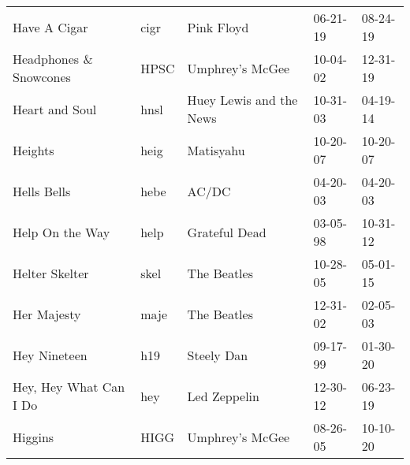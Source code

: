 \begin{longtable}{p{}p{}p{}p{}p{}}
                                                            Have A Cigar &          cigr &                                               Pink Floyd &              06-21-19 &             08-24-19 \\
                                                 Headphones \& Snowcones &          HPSC &                                          Umphrey's McGee &              10-04-02 &             12-31-19 \\
                                                          Heart and Soul &          hnsl &                                  Huey Lewis and the News &              10-31-03 &             04-19-14 \\
                                                                 Heights &          heig &                                                Matisyahu &              10-20-07 &             10-20-07 \\
                                                             Hells Bells &          hebe &                                                    AC/DC &              04-20-03 &             04-20-03 \\
                                                         Help On the Way &          help &                                            Grateful Dead &              03-05-98 &             10-31-12 \\
                                                          Helter Skelter &          skel &                                              The Beatles &              10-28-05 &             05-01-15 \\
                                                             Her Majesty &          maje &                                              The Beatles &              12-31-02 &             02-05-03 \\
                                                            Hey Nineteen &           h19 &                                               Steely Dan &              09-17-99 &             01-30-20 \\
                                                  Hey, Hey What Can I Do &           hey &                                             Led Zeppelin &              12-30-12 &             06-23-19 \\
                                                                 Higgins &          HIGG &                                          Umphrey's McGee &              08-26-05 &             10-10-20 \\

\end{longtable}
